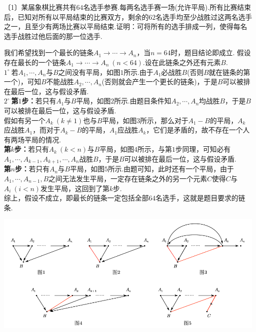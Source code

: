 \documentclass[cn,hazy,black,10pt,normal]{elegantnote}
\newenvironment{guess}{
  \color{guess}}{\newline \color{black}}
\newcommand{\nd}[1]{〔#1〕}
\newcommand{\buzhou}[1]{$#1^{\circ} \ $}
\begin{document}
\begin{problem} %
	\nd{1}某届象棋比赛共有$64$名选手参赛.每两名选手赛一场(允许平局).所有比赛结束后，已知对所有以平局结束的比赛双方，剩余的$62$名选手均至少战胜过这两名选手之一，且至少有两场比赛以平局结束.证明：可将所有的选手排成一列，使得每名选手战胜过他后面的那一位选手.
\end{problem}
\begin{solution}
	\begin{guess}
		我们希望找到一个最长的链条$A_1 \to \cdots \to A_n$，当$n=64$时，题目结论即成立.
	\end{guess}
	假设存在最长的一个链条$A_1 \to \cdots \to A_n~(n < 64)$.设在此链条之外还有元素$B$. \\
	\buzhou{1}若$A_1, \cdots ,A_n$与$B$之间没有平局，如图$1$所示.由于$A_1$必战胜$B$(否则$B$就在链条的第一个)，可知$B$不能战胜$A_2, \cdots ,A_n$(否则就会产生一个更长的链条)，于是$B$可以被排在最后一位，这与假设矛盾. \\
	\buzhou{2}\textbf{第$1$步：}若只有$A_1$与$B$平局，如图$2$所示.由题目条件知$A_2, \cdots ,A_n$均战胜$B$，于是$B$可以被排在最后一位，这与假设矛盾. \\
	假如有另一个$A_k~(k \neq 1)$也与$B$平局，如图$3$所示，那么对于$A_1-B$的平局，$A_k$应战胜$A_1$，而对于$A_k-B$的平局，$A_1$应战胜$A_k$，它们是矛盾的，故不存在一个人有两场平局的情况. \\
	\textbf{第$k$步：}若只有$A_k~(k<n)$与$B$平局，如图$4$所示，与第$1$步同理，可知必有$A_1, \cdots ,A_{k-1},A_{k+1}, \cdots ,A_n$战胜$B$，于是$B$可以被排在最后一位，这与假设矛盾. \\
	\textbf{第$n$步：}若只有$A_n$与$B$平局，如图$5$所示.由题可知，此时还有一个平局，由于$A_1, \cdots ,A_{n-1},B$之间无法发生平局，一定存在链条之外的另一个元素$C$使得$C$与$A_i~(i<n)$发生平局，这回到了第$k$步. \\
	综上，假设不成立，即最长的链条一定包括全部$64$名选手，这就是题目要求的链条.
	\begin{center}
		\includegraphics[width=16cm]{attachment/202302074.pdf}
	\end{center}
\end{solution}
\end{document}

